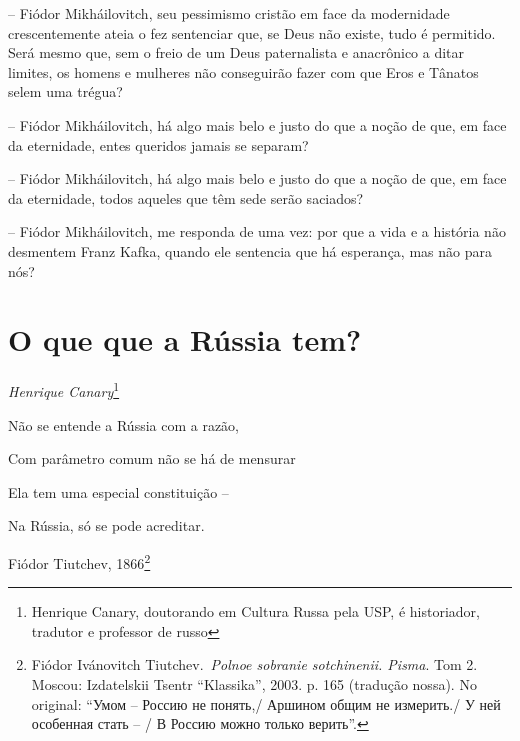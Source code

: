 -- Fiódor Mikháilovitch, seu pessimismo cristão em face da modernidade
crescentemente ateia o fez sentenciar que, se Deus não existe, tudo é
permitido. Será mesmo que, sem o freio de um Deus paternalista e
anacrônico a ditar limites, os homens e mulheres não conseguirão fazer
com que Eros e Tânatos selem uma trégua?

-- Fiódor Mikháilovitch, há algo mais belo e justo do que a noção de
que, em face da eternidade, entes queridos jamais se separam?

-- Fiódor Mikháilovitch, há algo mais belo e justo do que a noção de
que, em face da eternidade, todos aqueles que têm sede serão saciados?

-- Fiódor Mikháilovitch, me responda de uma vez: por que a vida e a
história não desmentem Franz Kafka, quando ele sentencia que há
esperança, mas não para nós?

\chapter*{O que que a Rússia tem?}

\begin{flushright}
\emph{Henrique Canary}\footnote{Henrique Canary, doutorando em Cultura Russa pela USP, é historiador, tradutor e professor de russo}
\end{flushright}

Não se entende a Rússia com a razão,

Com parâmetro comum não se há de mensurar

Ela tem uma especial constituição --

Na Rússia, só se pode acreditar.

Fiódor Tiutchev, 1866\footnote{Fiódor Ivánovitch Tiutchev.~\emph{Polnoe
  sobranie sotchinenii. Pisma}. Tom 2. Moscou: Izdatelskii Tsentr
  ``Klassika'', 2003. p. 165 (tradução nossa). No original: ``Умом --
  Россию не понять,/ Аршином общим не измерить./ У ней особенная стать
  -- / В Россию можно только верить''.}

